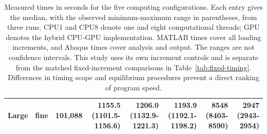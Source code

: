 \begin{table}[!htbp]
\begin{tabular}{@{}llrrrrrr@{}}
Large & fine & 101,088 & \shortstack[r]{1155.5\\(1101.5-1156.6)} & \shortstack[r]{1206.0\\(1132.9-1221.3)} & \shortstack[r]{1193.9\\(1192.1-1198.2)} & \shortstack[r]{8548\\(8403-8590)} & \shortstack[r]{2947\\(2943-2954)} \\[3pt]
\bottomrule
\end{tabular}
\caption{Measured times in seconds for the five computing configurations. Each entry gives the median, with the observed minimum-maximum range in parentheses, from three runs. CPU1 and CPU8 denote one and eight computational threads; GPU denotes the hybrid CPU-GPU implementation. MATLAB times cover all loading increments, and Abaqus times cover analysis and output. The ranges are not confidence intervals. This study uses its own increment controls and is separate from the matched fixed-increment comparisons in Table~\ref{tab:fixed-timing}. Differences in timing scope and equilibrium procedures prevent a direct ranking of program speed.}
\label{tab:scaling}
\end{table}
